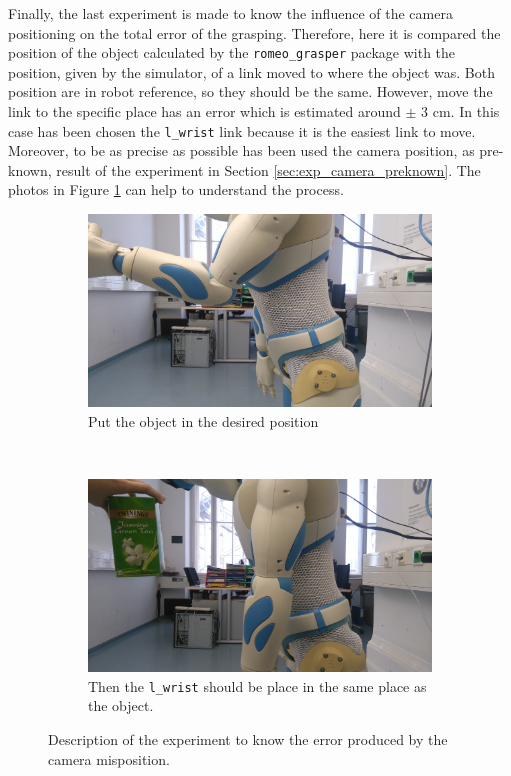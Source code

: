 \documentclass[12pt,a4paper,final,twoside,openright]{report}
\begin{document}
Finally, the last experiment is made to know the influence of the camera positioning on the total error of the grasping. Therefore, here it is compared the position of the object calculated by the \texttt{romeo\_grasper} package with the position, given by the simulator, of a link moved to where the object was. Both position are in robot reference, so they should be the same. However, move the link to the specific place has an error which is estimated around $\pm$ 3 cm. In this case has been chosen the \texttt{l\_wrist} link because it is the easiest link to move. Moreover, to be as precise as possible has been used the camera position, as pre-known, result of the experiment in Section \ref{sec:exp_camera_preknown}. The photos in Figure \ref{fig:exp_camera_positioning_error_photos} can help to understand the process.

\begin{figure}[h]
\centering
\begin{subfigure}[r]{0.45\textwidth}
		\includegraphics[width=\textwidth]{images/DSC_0003.JPG}
        \caption{Put the object in the desired position}
\end{subfigure}
~
\begin{subfigure}[r]{0.45\textwidth}
		\includegraphics[width=\textwidth]{images/DSC_0004.JPG}
        \caption{Then the \texttt{l\_wrist} should be place in the same place as the object.}
\end{subfigure}
\caption{Description of the experiment to know the error produced by the camera misposition.\label{fig:exp_camera_positioning_error_photos}}
\end{figure}
\end{document}
